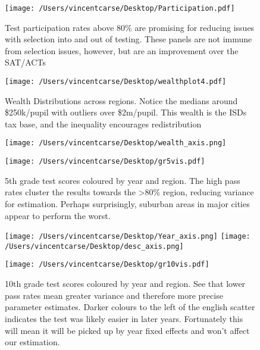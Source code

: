 \documentclass[11pt]{article}
\begin{document}
\begin{figure}
    \label{image-myimage}
    \texttt{[image: /Users/vincentcarse/Desktop/Participation.pdf]}
    \caption{Test participation rates above 80\% are promising for reducing issues with selection into and out of testing. These panels are not immune from selection issues, however, but are an improvement over the SAT/ACTs }
\end{figure}

\begin{figure}
    \label{image-myimage}
    \texttt{[image: /Users/vincentcarse/Desktop/wealthplot4.pdf]}
    \caption{Wealth Distributions across regions. Notice the medians around \$250k/pupil with outliers over \$2m/pupil. This wealth is the ISDs tax base, and the inequality encourages redistribution}
\end{figure}

\begin{figure}
    \label{image-myimage}
    \texttt{[image: /Users/vincentcarse/Desktop/wealth\_axis.png]}
\end{figure}

\begin{figure}
    \label{Can I see this label?}
    \texttt{[image: /Users/vincentcarse/Desktop/gr5vis.pdf]}
    \caption{5th grade test scores coloured by year and region. The high pass rates cluster the results towards the \textgreater80\% region, reducing variance for estimation. Perhaps surprisingly, suburban areas in major cities appear to perform the worst.}
\end{figure}

\begin{figure}
    \label{Can I see this label?}
    \texttt{[image: /Users/vincentcarse/Desktop/Year\_axis.png]}
    \texttt{[image: /Users/vincentcarse/Desktop/desc\_axis.png]}
\end{figure}


\begin{figure}
    \label{image-myimage}
    \texttt{[image: /Users/vincentcarse/Desktop/gr10vis.pdf]}
    \caption{10th grade test scores coloured by year and region. See that lower pass rates mean greater variance and therefore more precise parameter estimates. Darker colours to the left of the english scatter indicates the test was likely easier in later years. Fortunately this will mean it will be picked up by year fixed effects and won't affect our estimation.}
\end{figure}
\end{document}
